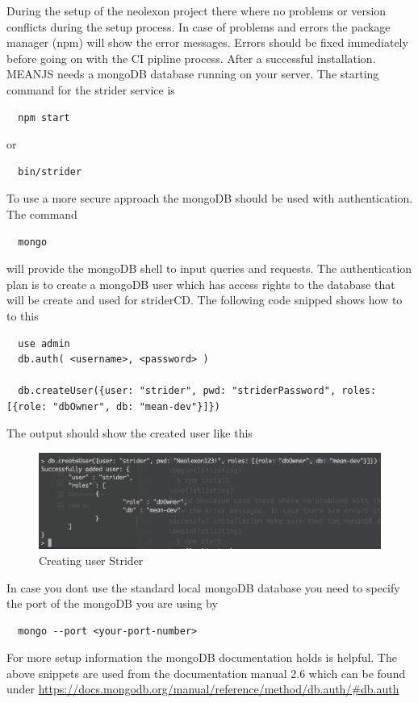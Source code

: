 During the setup of the neolexon project there where no problems or version conflicts during the setup process. In case of problems and errors
the package manager (npm) will show the error messages. Errors should be fixed immediately before going on with the CI pipline process. After a
successful installation. MEANJS needs a mongoDB database running on your server. The starting command for the strider service is
\begin{lstlisting}
  npm start
\end{lstlisting}
or
\begin{lstlisting}
  bin/strider
\end{lstlisting}
To use a more secure approach the mongoDB should be used with authentication. The command
\begin{lstlisting}
  mongo
\end{lstlisting}
will provide the mongoDB shell to input queries and requests. The authentication plan is to create a mongoDB user which has access
rights to the database that will be create and used for striderCD. The following code snipped shows how to to this
\begin{lstlisting}
  use admin
  db.auth( <username>, <password> )

  db.createUser({user: "strider", pwd: "striderPassword", roles: [{role: "dbOwner", db: "mean-dev"}]})
\end{lstlisting}
The output should show the created user like this
\begin{figure}[h!]
  \centering
  \includegraphics[width=1\textwidth]{images/createUser.png}
  \caption{Creating user Strider}
\end{figure}
In case you dont use the standard local mongoDB database you need to specify the port of the mongoDB you are using by
\begin{lstlisting}
  mongo --port <your-port-number>
\end{lstlisting}
For more setup information the mongoDB documentation holds is helpful. The above snippets are
used from the documentation manual 2.6 which can be found under \url{https://docs.mongodb.org/manual/reference/method/db.auth/#db.auth}

